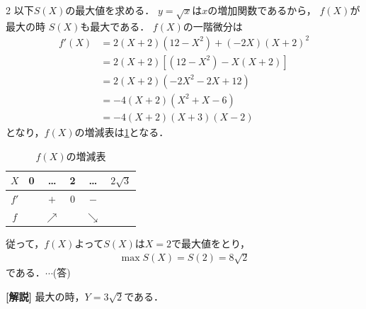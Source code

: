 \documentclass[../../../../main.tex]{subfiles}
\begin{document}
\begin{multicols}{2}
    以下$S(X)$の最大値を求める．
    $y=\sqrt{x}$は$x$の増加関数であるから，
    $f(X)$が最大の時 $S(X)$も最大である．
    $f(X)$の一階微分は
    \begin{align*}
        f'(X)
         & = 2(X+2)(12-X^2) + (-2X)(X+2)^2 \\
         & = 2(X+2) [ (12-X^2) - X(X+2) ]  \\
         & = 2(X+2) (-2X^2-2X+12)          \\
         & = -4(X+2) (X^2+X-6)             \\
         & = -4(X+2) (X+3)(X-2)
    \end{align*}
    となり，$f(X)$の増減表は\cref{1989-3:table:1}となる．
    \begin{table}[H]
        \centering
        \caption{$f(X)$の増減表}
        \label{1989-3:table:1}
        \begin{tabular}{|c||c|c|c|c|c|}
            \hline
            $X$  & 0 & \dots      & 2 & \dots      & $2\sqrt{3}$ \\
            \hline
            $f'$ &   & $+$        & 0 & $-$        &             \\
            \hline
            $f$  &   & $\nearrow$ &   & $\searrow$ &             \\
            \hline
        \end{tabular}
    \end{table}
    従って，$f(X)$よって$S(X)$は$X=2$で最大値をとり，
    \begin{align*}
        \max S(X)=S(2)=8\sqrt{2}
    \end{align*}
    である．$\cdots$(答)

    \vspace{10pt}
    {\bf[解説]}
    最大の時，$Y=3\sqrt{2}$である．

    \newpage
\end{multicols}
\end{document}
